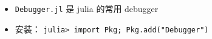 
\begin{issues}
\issueDraft
\end{issues}

\begin{itemize}
\item \verb|Debugger.jl| 是 julia 的常用 debugger
\item 安装： \verb|julia> import Pkg; Pkg.add("Debugger")|
\end{itemize}
